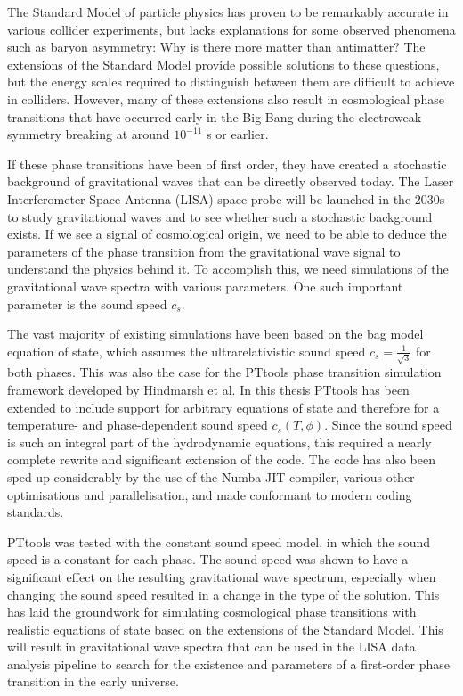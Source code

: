 The Standard Model of particle physics has proven to be remarkably accurate in various collider experiments,
but lacks explanations for some observed phenomena such as baryon asymmetry: Why is there more matter than antimatter?
The extensions of the Standard Model provide possible solutions to these questions,
but the energy scales required to distinguish between them are difficult to achieve in colliders.
However, many of these extensions also result in cosmological phase transitions that have occurred early in the Big Bang during the electroweak symmetry breaking at around $10^{-11}$ s or earlier.

If these phase transitions have been of first order,
they have created a stochastic background of gravitational waves that can be directly observed today.
The Laser Interferometer Space Antenna (LISA) space probe will be launched in the 2030s to study gravitational waves and
to see whether such a stochastic background exists.
If we see a signal of cosmological origin,
we need to be able to deduce the parameters of the phase transition from the gravitational wave signal to understand the physics behind it.
To accomplish this, we need simulations of the gravitational wave spectra with various parameters.
One such important parameter is the sound speed $c_s$.

The vast majority of existing simulations have been based on the bag model equation of state,
which assumes the ultrarelativistic sound speed $c_s =\frac{1}{\sqrt{3}}$ for both phases.
This was also the case for the PTtools phase transition simulation framework developed by Hindmarsh et al.
In this thesis PTtools has been extended to include support for arbitrary equations of state and therefore for a temperature- and phase-dependent sound speed $c_s(T,\phi)$.
Since the sound speed is such an integral part of the hydrodynamic equations,
this required a nearly complete rewrite and significant extension of the code.
The code has also been sped up considerably by the use of the Numba JIT compiler, various other optimisations and parallelisation,
and made conformant to modern coding standards.

PTtools was tested with the constant sound speed model, in which the sound speed is a constant for each phase.
The sound speed was shown to have a significant effect on the resulting gravitational wave spectrum,
especially when changing the sound speed resulted in a change in the type of the solution.
This has laid the groundwork for simulating cosmological phase transitions with realistic equations of state based on the extensions of the Standard Model.
This will result in gravitational wave spectra that can be used in the LISA data analysis pipeline to search for the existence and parameters of a first-order phase transition in the early universe.
